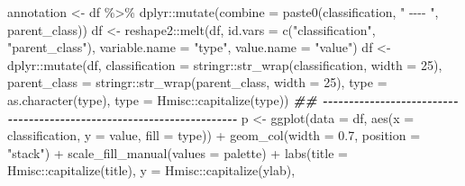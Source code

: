 \documentclass[
]{article}
\newenvironment{Shaded}{\begin{snugshade}}{\end{snugshade}}
\newcommand{\AttributeTok}[1]{\textcolor[rgb]{0.77,0.63,0.00}{#1}}
\newcommand{\DecValTok}[1]{\textcolor[rgb]{0.00,0.00,0.81}{#1}}
\newcommand{\DocumentationTok}[1]{\textcolor[rgb]{0.56,0.35,0.01}{\textbf{\textit{#1}}}}
\newcommand{\FloatTok}[1]{\textcolor[rgb]{0.00,0.00,0.81}{#1}}
\newcommand{\FunctionTok}[1]{\textcolor[rgb]{0.00,0.00,0.00}{#1}}
\newcommand{\NormalTok}[1]{#1}
\newcommand{\OtherTok}[1]{\textcolor[rgb]{0.56,0.35,0.01}{#1}}
\newcommand{\SpecialCharTok}[1]{\textcolor[rgb]{0.00,0.00,0.00}{#1}}
\newcommand{\StringTok}[1]{\textcolor[rgb]{0.31,0.60,0.02}{#1}}
\begin{document}
\begin{Shaded}
\begin{Highlighting}[]
\NormalTok{    annotation }\OtherTok{\textless{}{-}}\NormalTok{ df }\SpecialCharTok{\%\textgreater{}\%}
\NormalTok{      dplyr}\SpecialCharTok{::}\FunctionTok{mutate}\NormalTok{(}\AttributeTok{combine =} \FunctionTok{paste0}\NormalTok{(classification, }\StringTok{" {-}{-}{-}{-} "}\NormalTok{, parent\_class))}
\NormalTok{    df }\OtherTok{\textless{}{-}}\NormalTok{ reshape2}\SpecialCharTok{::}\FunctionTok{melt}\NormalTok{(df, }\AttributeTok{id.vars =} \FunctionTok{c}\NormalTok{(}\StringTok{"classification"}\NormalTok{, }\StringTok{"parent\_class"}\NormalTok{),}
                         \AttributeTok{variable.name =} \StringTok{"type"}\NormalTok{,}
                         \AttributeTok{value.name =} \StringTok{"value"}\NormalTok{)}
\NormalTok{    df }\OtherTok{\textless{}{-}}\NormalTok{ dplyr}\SpecialCharTok{::}\FunctionTok{mutate}\NormalTok{(df,}
                        \AttributeTok{classification =}\NormalTok{ stringr}\SpecialCharTok{::}\FunctionTok{str\_wrap}\NormalTok{(classification, }\AttributeTok{width =} \DecValTok{25}\NormalTok{),}
                        \AttributeTok{parent\_class =}\NormalTok{ stringr}\SpecialCharTok{::}\FunctionTok{str\_wrap}\NormalTok{(parent\_class, }\AttributeTok{width =} \DecValTok{25}\NormalTok{),}
                        \AttributeTok{type =} \FunctionTok{as.character}\NormalTok{(type),}
                        \AttributeTok{type =}\NormalTok{ Hmisc}\SpecialCharTok{::}\FunctionTok{capitalize}\NormalTok{(type))}
    \DocumentationTok{\#\# {-}{-}{-}{-}{-}{-}{-}{-}{-}{-}{-}{-}{-}{-}{-}{-}{-}{-}{-}{-}{-}{-}{-}{-}{-}{-}{-}{-}{-}{-}{-}{-}{-}{-}{-}{-}{-}{-}{-}{-}{-}{-}{-}{-}{-}{-}{-}{-}{-}{-}{-}{-}{-}{-}{-}{-}{-}{-}{-}{-}{-}{-}{-}{-}{-}{-}{-}{-}{-}{-} }
\NormalTok{    p }\OtherTok{\textless{}{-}} \FunctionTok{ggplot}\NormalTok{(}\AttributeTok{data =}\NormalTok{ df,}
                \FunctionTok{aes}\NormalTok{(}\AttributeTok{x =}\NormalTok{ classification,}
                    \AttributeTok{y =}\NormalTok{ value,}
                    \AttributeTok{fill =}\NormalTok{ type)) }\SpecialCharTok{+}
      \FunctionTok{geom\_col}\NormalTok{(}\AttributeTok{width =} \FloatTok{0.7}\NormalTok{,}
               \AttributeTok{position =} \StringTok{"stack"}\NormalTok{) }\SpecialCharTok{+}
      \FunctionTok{scale\_fill\_manual}\NormalTok{(}\AttributeTok{values =}\NormalTok{ palette) }\SpecialCharTok{+}
      \FunctionTok{labs}\NormalTok{(}\AttributeTok{title =}\NormalTok{ Hmisc}\SpecialCharTok{::}\FunctionTok{capitalize}\NormalTok{(title),}
           \AttributeTok{y =}\NormalTok{ Hmisc}\SpecialCharTok{::}\FunctionTok{capitalize}\NormalTok{(ylab),}

\end{Highlighting}
\end{Shaded}
\end{document}

